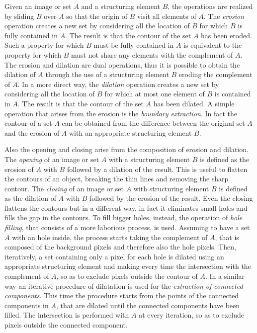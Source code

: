 \documentclass[final,a4paper,12pt,english]{UnicaPhdThesis3}
\begin{document}
	
	Given an image or set $A$ and a structuring element $B$, the operations are realized by sliding $B$ over $A$ so that the origin of $B$ visit all elements of $A$. The \textit{erosion} operation creates a new set by considering all the location of $B$ for which $B$ is fully contained in $A$. The result is that the contour of the set $A$ has been eroded. Such a property for which $B$ must be fully contained in $A$ is equivalent to the property for which $B$ must not share any elements with the complement of $A$. The erosion and dilation are dual operations, thus it is possible to obtain the dilation of $A$ through the use of a structuring element $B$ eroding the complement of $A$. In a more direct way, the \textit{dilation} operation creates a new set by considering all the location of $B$ for which at most one element of $B$ is contained in $A$. The result is that the contour of the set $A$ has been dilated. A simple operation that arises from the erosion is the \textit{boundary extraction}. In fact the contour of a set $A$ can be obtained from the difference between the original set $A$ and the erosion of $A$ with an appropriate structuring element $B$.
	
	Also the opening and closing arise from the composition of erosion and dilation. The \textit{opening} of an image or set $A$ with a structuring element $B$ is defined as the erosion of $A$ with $B$ followed by a dilation of the result. This is useful to flatten the contours of an object, breaking the thin lines and removing the sharp contour. The \textit{closing} of an image or set $A$ with structuring element $B$ is defined as the dilation of $A$ with $B$ followed by the erosion of the result. Even the closing flattens the contours but in a different way, in fact it eliminates small holes and fills the gap in the contours. To fill bigger holes, instead, the operation of \textit{hole filling}, that consists of a more laborious process, is used. Assuming to have a set $A$ with an hole inside, the process starts taking the complement of $A$, that is composed of the background pixels and therefore also the hole pixels. Then, iteratively, a set containing only a pixel for each hole is dilated using an appropriate structuring element and making every time the intersection with the complement of $A$, so as to exclude pixels outside the contour of $A$. In a similar way an iterative procedure of dilatation is used for the \textit{extraction of connected components}. This time the procedure starts from the points of the connected components in $A$, that are dilated until the connected components have been filled. The intersection is performed with $A$ at every iteration, so as to exclude pixels outside the connected component. 
	
\end{document}
